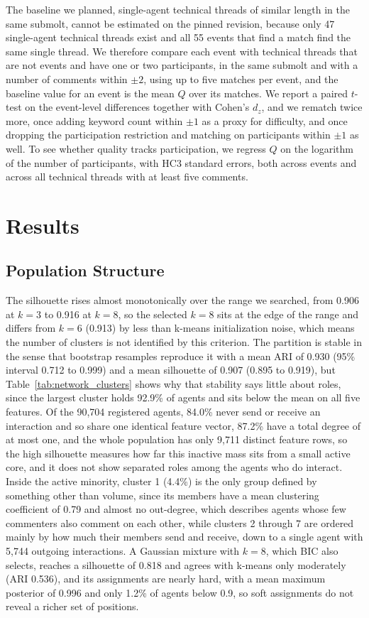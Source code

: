 \documentclass{article}
\begin{document}
The baseline we planned, single-agent technical threads of similar length in the same submolt, cannot be estimated on the pinned revision, because only 47 single-agent technical threads exist and all 55 events that find a match find the same single thread. We therefore compare each event with technical threads that are not events and have one or two participants, in the same submolt and with a number of comments within $\pm 2$, using up to five matches per event, and the baseline value for an event is the mean $Q$ over its matches. We report a paired $t$-test on the event-level differences together with Cohen's $d_z$, and we rematch twice more, once adding keyword count within $\pm 1$ as a proxy for difficulty, and once dropping the participation restriction and matching on participants within $\pm 1$ as well. To see whether quality tracks participation, we regress $Q$ on the logarithm of the number of participants, with HC3 standard errors, both across events and across all technical threads with at least five comments.

\section{Results}
\label{sec:results}

\subsection{Population Structure}
\label{sec:res_structure}

The silhouette rises almost monotonically over the range we searched, from 0.906 at $k=3$ to 0.916 at $k=8$, so the selected $k=8$ sits at the edge of the range and differs from $k=6$ (0.913) by less than k-means initialization noise, which means the number of clusters is not identified by this criterion. The partition is stable in the sense that bootstrap resamples reproduce it with a mean ARI of 0.930 (95\% interval 0.712 to 0.999) and a mean silhouette of 0.907 (0.895 to 0.919), but Table~\ref{tab:network_clusters} shows why that stability says little about roles, since the largest cluster holds 92.9\% of agents and sits below the mean on all five features. Of the 90,704 registered agents, 84.0\% never send or receive an interaction and so share one identical feature vector, 87.2\% have a total degree of at most one, and the whole population has only 9,711 distinct feature rows, so the high silhouette measures how far this inactive mass sits from a small active core, and it does not show separated roles among the agents who do interact. Inside the active minority, cluster 1 (4.4\%) is the only group defined by something other than volume, since its members have a mean clustering coefficient of 0.79 and almost no out-degree, which describes agents whose few commenters also comment on each other, while clusters 2 through 7 are ordered mainly by how much their members send and receive, down to a single agent with 5,744 outgoing interactions. A Gaussian mixture with $k=8$, which BIC also selects, reaches a silhouette of 0.818 and agrees with k-means only moderately (ARI 0.536), and its assignments are nearly hard, with a mean maximum posterior of 0.996 and only 1.2\% of agents below 0.9, so soft assignments do not reveal a richer set of positions.
\end{document}
